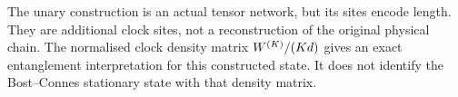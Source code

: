 The unary construction is an actual tensor network, but its sites
encode length. They are additional clock sites, not a reconstruction
of the original physical chain. The normalised clock density matrix
$W^{(K)}/(Kd)$ gives an exact entanglement interpretation for this
constructed state. It does not identify the Bost--Connes stationary
state with that density matrix.
